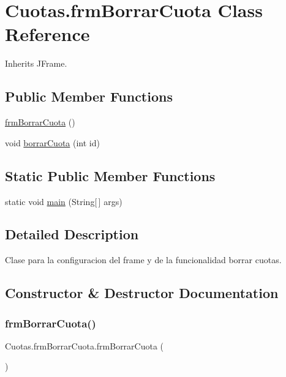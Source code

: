\hypertarget{class_cuotas_1_1frm_borrar_cuota}{}\section{Cuotas.\+frm\+Borrar\+Cuota Class Reference}
\label{class_cuotas_1_1frm_borrar_cuota}


Inherits J\+Frame.

\subsection*{Public Member Functions}
\begin{DoxyCompactItemize}
\item 
\hyperlink{class_cuotas_1_1frm_borrar_cuota_aaac5487957c589a4d320cffdb1cb3cb0}{frm\+Borrar\+Cuota} ()
\item 
void \hyperlink{class_cuotas_1_1frm_borrar_cuota_a93f34d4f2c825db8d6050660c2b2679a}{borrar\+Cuota} (int id)
\end{DoxyCompactItemize}
\subsection*{Static Public Member Functions}
\begin{DoxyCompactItemize}
\item 
static void \hyperlink{class_cuotas_1_1frm_borrar_cuota_afbe843b84f2ad8b3fda58d1fe8ae3889}{main} (String\mbox{[}$\,$\mbox{]} args)
\end{DoxyCompactItemize}


\subsection{Detailed Description}
Clase para la configuracion del frame y de la funcionalidad borrar cuotas. 

\subsection{Constructor \& Destructor Documentation}
\mbox{\label{class_cuotas_1_1frm_borrar_cuota_aaac5487957c589a4d320cffdb1cb3cb0}} 
\subsubsection{\texorpdfstring{frm\+Borrar\+Cuota()}{frmBorrarCuota()}}
{\footnotesize\ttfamily Cuotas.\+frm\+Borrar\+Cuota.\+frm\+Borrar\+Cuota (\begin{DoxyParamCaption}{ }\end{DoxyParamCaption})}

